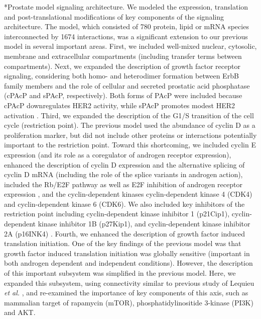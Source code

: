 \documentclass[12pt]{article}
\makeatletter
\renewcommand\subsection{\@startsection
	{subsection}{2}{0mm}
	{-0.05in}
	{-0.5\baselineskip}
	{\normalfont\normalsize\bfseries}}
\makeatother
\begin{document}
\subsection*{Prostate model signaling architecture.}
We modeled the expression, translation and post-translational modifications of key components of the signaling architecture.  
The model, which consisted of 780 protein, lipid or mRNA species interconnected by 1674 interactions, was a significant extension to our previous model \cite{Tasseff2010} in several important areas. 
First, we included well-mixed nuclear, cytosolic, membrane and extracellular compartments (including transfer terms between compartments).
Next, we expanded the description of growth factor receptor signaling, considering both homo- and heterodimer formation between ErbB family members and the role of cellular and secreted prostatic acid phosphatase (cPAcP and sPAcP, respectively).
Both forms of PAcP were included because cPAcP downregulates HER2 activity, while sPAcP promotes modest HER2 activation \cite{Veeramani2005}. 
Third, we expanded the description of the G1/S transition of the cell cycle (restriction point). 
The previous model used the abundance of cyclin D as a proliferation marker, but did not include other proteins or interactions potentially important to the restriction point.
Toward this shortcoming, we included cyclin E expression (and its role as a coregulator of androgen receptor expression), enhanced the description of cyclin D expression and the alternative splicing of cyclin D mRNA (including the role of the splice variants in androgen action), included the Rb/E2F pathway as well as E2F inhibition of androgen receptor expression \cite{Davis2006}, and the cyclin-dependent kinases cyclin-dependent kinase 4 (CDK4) and cyclin-dependent kinase 6 (CDK6). 
We also included key inhibitors of the restriction point including cyclin-dependent kinase inhibitor 1 (p21Cip1), cyclin-dependent kinase inhibitor 1B (p27Kip1), and cyclin-dependent kinase inhibitor 2A (p16INK4) \cite{Sherr1999}. 
Fourth, we enhanced the description of growth factor induced translation initiation.
One of the key findings of the previous model was that growth factor induced translation initiation was globally sensitive (important in both androgen dependent and independent conditions). 
However, the description of this important subsystem was simplified in the previous model. 
Here, we expanded this subsystem, using connectivity similar to previous study of Lequieu \textit{et al.} \cite{Lequieu:2011eu}, and re-examined the importance of key components of this axis, such as mammalian target of rapamycin (mTOR), phosphatidylinositide 3-kinase (PI3K) and AKT.  
\end{document}
